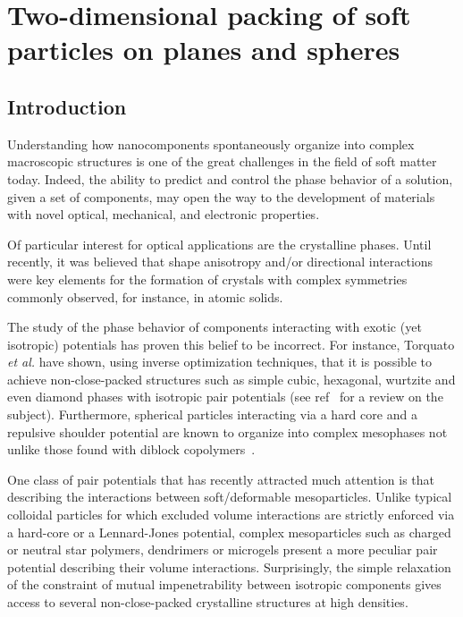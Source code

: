 \chapter{Two-dimensional packing of soft particles on planes and spheres}
\label{chap:2dsoft}

\section{Introduction}
Understanding how nanocomponents spontaneously organize into complex macroscopic structures
is one of the great challenges in the field of soft matter today. Indeed, the ability to predict and control 
the phase behavior of a solution, given a set of components, may open the way to the development
of materials with novel optical, mechanical, and electronic properties. 

Of particular interest for optical applications are the crystalline phases. Until recently, it was believed that 
shape anisotropy and/or directional interactions were key elements for the formation of 
crystals with complex symmetries commonly observed, for instance, in atomic solids. 

The study of
the phase behavior of components interacting with exotic (yet isotropic) potentials has 
proven this belief to be incorrect. For instance,
Torquato \textit{et al.} have shown, using inverse optimization techniques, that it is possible to achieve
non-close-packed structures such as simple cubic, hexagonal,  wurtzite and even diamond phases
with isotropic pair potentials  (see ref~\cite{torquato} for a review on the subject). 
Furthermore, spherical particles interacting via a hard core and a repulsive shoulder potential are known to organize into complex mesophases not unlike those found with diblock copolymers~\cite{glaser2}. 

One class of pair potentials that has recently attracted much attention  
is that describing the interactions between soft/deformable mesoparticles. 
Unlike  typical colloidal particles for which excluded volume interactions are strictly enforced via a hard-core or a Lennard-Jones potential,  complex mesoparticles such as charged or neutral star polymers, dendrimers or microgels present a more peculiar pair potential describing their volume interactions. 
Surprisingly, the simple relaxation of the constraint of mutual impenetrability between isotropic 
components gives access to several non-close-packed crystalline structures at high densities.

